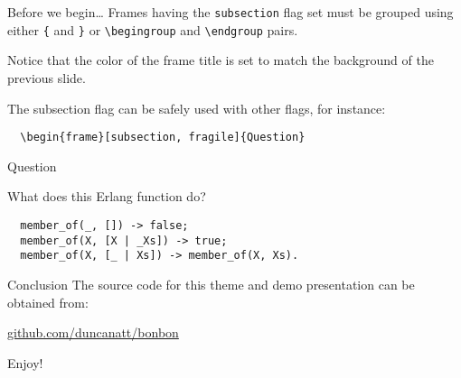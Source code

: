 \documentclass{beamer} %
\begin{document}
{
\begin{frame}{Before we begin\ldots}
  Frames having the \texttt{subsection} flag set must be grouped
  using either \texttt{\{} and \texttt{\}} or \texttt{\textbackslash{begingroup}}
  and \texttt{\textbackslash{endgroup}} pairs.

  \bigskip
  Notice that the color of the frame title is set to match the background of
  the previous slide.

  \bigskip
  The subsection flag can be safely used with other flags, for instance:
  \begin{verbatim}  \begin{frame}[subsection, fragile]{Question}\end{verbatim}
\end{frame}

\begin{frame}{Question}
  \begin{block}{What does this Erlang function do?}
  \begin{lstlisting}
  member_of(_, []) -> false;
  member_of(X, [X | _Xs]) -> true;
  member_of(X, [_ | Xs]) -> member_of(X, Xs).
  \end{lstlisting}
  \end{block}

  \bigskip
\end{frame}
}

\begin{frame}{Conclusion}
  The source code for this theme and demo presentation can be obtained from:
  \begin{center}\url{github.com/duncanatt/bonbon}\end{center}
  Enjoy!
\end{frame}
\end{document}
